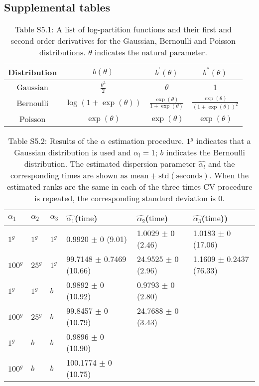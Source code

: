\subsection{Supplemental tables}
\begin{table}[htbp]
\centering
\caption*{Table S5.1: A list of log-partition functions and their first and second order derivatives for the Gaussian, Bernoulli and Poisson
distributions. $\theta$ indicates the natural parameter.}
\label{chapter5_tab:S1}
\begin{tabular}{cccc}
  \toprule
Distribution & $b(\theta)$ & $b^{'}(\theta)$ & $b^{''}(\theta)$ \\
  \midrule
Gaussian     & $\frac{\theta^2}{2}$    & $\theta$ & 1 \\
Bernoulli    & $\log(1+\exp(\theta))$ & $\frac{\exp(\theta)}{1+\exp(\theta)}$ & $\frac{\exp(\theta)}{(1+\exp(\theta))^2}$ \\
Poisson      & $\exp(\theta)$ & $\exp(\theta)$ & $\exp(\theta)$ \\
  \bottomrule
\end{tabular}
\end{table}


\begin{table}[htbp]
\centering
\caption*{Table S5.2: Results of the $\alpha$ estimation procedure. $1^{g}$ indicates that a Gaussian distribution is used and $\alpha_l = 1$; $b$ indicates the Bernoulli distribution.  The estimated dispersion parameter $\hat{\alpha_l}$ and the corresponding times are shown as $\text{mean} \pm \text{std} (\text{seconds})$. When the estimated ranks are the same in each of the three times CV procedure is repeated, the corresponding standard deviation is 0.}
\label{chapter5_tab:S2}
\begin{tabular}{llllll}
 \hline
   $\alpha_1$ & $\alpha_2$ & $\alpha_3$ & $\hat{\alpha_1}$($\text{time}$) & $\hat{\alpha_2}$($\text{time}$) & $\hat{\alpha_3}$($\text{time}$)) \\
 \hline
  $1^{g}$   & $1^{g}$  & $1^{g}$ & 0.9920  $\pm$ 0 (9.01)  & 1.0029  $\pm$ 0 (2.46) & 1.0183 $\pm$ 0 (17.06) \\
  $100^{g}$ & $25^{g}$ & $1^{g}$ & 99.7148 $\pm$ 0.7469 (10.66) & 24.9525 $\pm$ 0 (2.96) & 1.1609 $\pm$ 0.2437 (76.33) \\
  \hline
  $1^{g}$   & $1^{g}$  & $b$     & 0.9892  $\pm$ 0 (10.92)  & 0.9793  $\pm$ 0 (2.80) &  \\
  $100^{g}$ & $25^{g}$ & $b$     & 99.8457 $\pm$ 0 (10.79)  & 24.7688 $\pm$ 0 (3.43) &  \\
  \hline
  $1^{g}$   & $b$ & $b$     & 0.9896   $\pm$ 0 (10.90) &  &  \\
  $100^{g}$ & $b$ & $b$     & 100.1774 $\pm$ 0 (10.75) &  &  \\

  \hline
\end{tabular}
\end{table}

